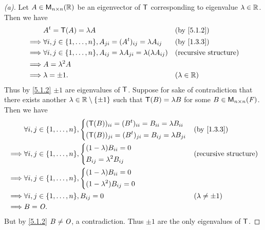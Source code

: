 \begin{proof}[(a)]
	Let \(A \in \mathsf{M}_{{n} \times n}({\mathbb{R}})\) be an eigenvector of \(\mathsf{T}\) corresponding to eigenvalue \(\lambda \in \mathbb{R}\).
	Then we have
	\begin{align*}
		         & \tp{A} = \T(A) = \lambda A                                                                &  & \by{5.1.2}                   \\
		\implies & \forall i, j \in \set{1, \dots, n}, A_{j i} = (\tp{A})_{i j} = \lambda A_{i j}            &  & \by{1.3.3}                   \\
		\implies & \forall i, j \in \set{1, \dots, n}, A_{i j} = \lambda A_{j i} = \lambda (\lambda A_{i j}) &  & \text{(recursive structure)} \\
		\implies & A = \lambda^2 A                                                                                                             \\
		\implies & \lambda = \pm 1.                                                                          &  & (\lambda \in \R)
	\end{align*}
	Thus by \cref{5.1.2} \(\pm 1\) are eigenvalues of \(\mathsf{T}\).
	Suppose for sake of contradiction that there exists another \(\lambda \in \mathbb{R} \setminus \left\lbrace\pm 1\right\rbrace\) such that \(\mathsf{T}(B) = \lambda B\) for some \(B \in \mathsf{M}_{{n} \times n}({\mathit{F}})\).
	Then we have
	\begin{align*}
		         & \forall i, j \in \set{1, \dots, n}, \begin{dcases}
			                                               (\T(B))_{i i} = (\tp{B})_{i i} = B_{i i} = \lambda B_{i i} \\
			                                               (\T(B))_{j i} = (\tp{B})_{j i} = B_{i j} = \lambda B_{j i}
		                                               \end{dcases} &  & \by{1.3.3} \\
		\implies & \forall i, j \in \set{1, \dots, n}, \begin{dcases}
			                                               (1 - \lambda) B_{i i} = 0 \\
			                                               B_{i j} = \lambda^2 B_{i j}
		                                               \end{dcases}            &  & \text{(recursive structure)}  \\
		\implies & \forall i, j \in \set{1, \dots, n}, \begin{dcases}
			                                               (1 - \lambda) B_{i i} = 0 \\
			                                               (1 - \lambda^2) B_{i j} = 0
		                                               \end{dcases}                                 \\
		\implies & \forall i, j \in \set{1, \dots, n}, B_{i j} = 0               &  & (\lambda \neq \pm 1)        \\
		\implies & B = \zm.
	\end{align*}
	But by \cref{5.1.2} \(B \neq \mathit{O}\), a contradiction.
	Thus \(\pm 1\) are the only eigenvalues of \(\mathsf{T}\).
\end{proof}

